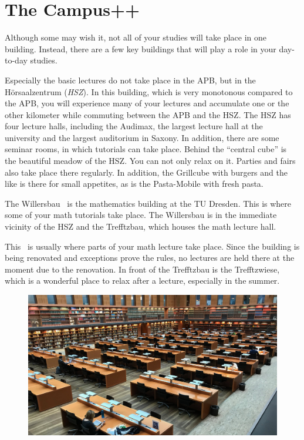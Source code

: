 \chapter{The Campus++}

Although some may wish it, not all of your studies will take place in one building. Instead, there are a few key buildings that will play a role in your day-to-day studies.

Especially the basic lectures do not take place in the APB, but in the Hörsaalzentrum (\emph{HSZ}). In this building, which is very monotonous compared to the APB, you will experience many of your lectures and accumulate one or the other kilometer while commuting between the APB and the HSZ. The HSZ has four lecture halls, including the Audimax, the largest lecture hall at the university and the largest auditorium in Saxony. In addition, there are some seminar rooms, in which tutorials can take place. Behind the \enquote{central cube} is the beautiful meadow of the HSZ\@. You can not only relax on it. Parties and fairs also take place there regularly.
In addition, the Grillcube with burgers and the like is there for small appetites, as is the Pasta-Mobile with fresh pasta.

The Willersbau~ is the mathematics building at the TU Dresden. This is where some of your math tutorials take place. The Willersbau is in the immediate vicinity of the HSZ and the Trefftzbau, which houses the math lecture hall.

This~ is usually where parts of your math lecture take place. Since the building is being renovated and exceptions prove the rules, no lectures are held there at the moment due to the renovation. In front of the Trefftzbau is the Trefftzwiese, which is a wonderful place to relax after a lecture, especially in the summer.

\begin{figure}[b!]
    \centering
    \includegraphics[width=\linewidth]{img/slub-lesesaal.jpg}
\end{figure}

